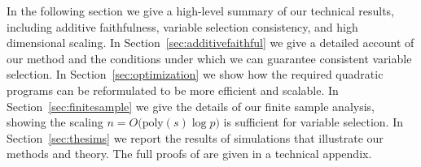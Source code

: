 %
%

In the following section we give a high-level summary of our technical
results, including additive faithfulness, variable selection 
consistency, and high dimensional scaling.  In
Section~\ref{sec:additivefaithful} we give a detailed account
of our method and the conditions under which we can guarantee
consistent variable selection.  In Section~\ref{sec:optimization}
we show how the required quadratic programs can be reformulated
to be more efficient and scalable.  In Section~\ref{sec:finitesample}
we give the details of our finite sample analysis, showing
the scaling $n = O\big(\textrm{poly}(s) \log p\big)$
is sufficient for variable selection.  In Section~\ref{sec:thesims}
we report the results of simulations that illustrate our methods
and theory.  The full proofs of are
given in a technical appendix.





